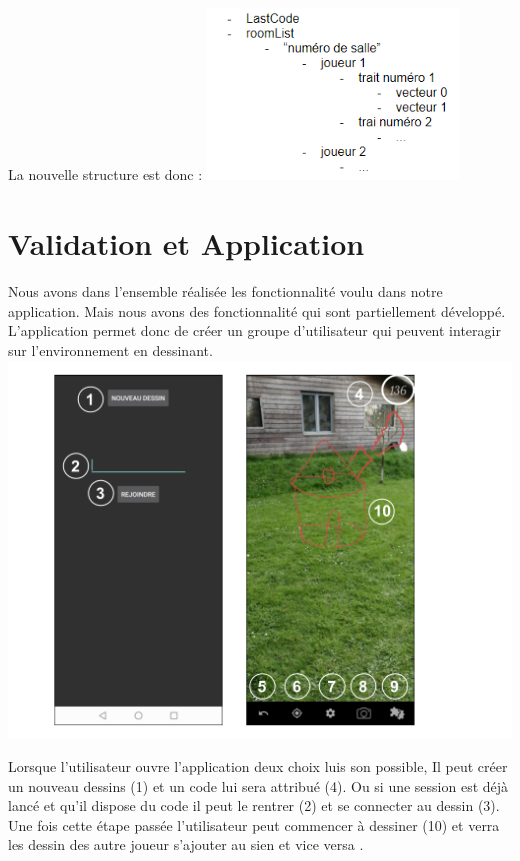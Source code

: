 \documentclass[12pt]{article}
\begin{document}
	\newline
	La nouvelle structure est donc :
	\newline
	\includegraphics[width=0.5\textwidth]{Capture.png}
	\newline
\section{Validation et Application}
\par
Nous avons dans l’ensemble réalisée les fonctionnalité voulu dans notre application. Mais nous avons des fonctionnalité qui sont partiellement développé. L’application permet donc de créer un groupe d’utilisateur qui peuvent interagir sur l’environnement en dessinant.
\newline
\includegraphics[width=1\textwidth]{dessin1.png}
\newline
\par
Lorsque l’utilisateur ouvre l’application deux choix luis son possible, Il peut créer un nouveau dessins (1) et un code lui sera attribué (4). Ou si une session est déjà lancé et qu’il dispose du code il peut le rentrer (2) et se connecter au dessin (3).
Une fois cette étape passée l’utilisateur peut commencer à dessiner (10) et verra les dessin des autre joueur s’ajouter au sien et vice versa .
\end{document}
